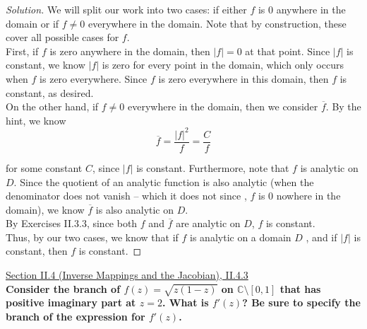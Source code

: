 \documentclass[11pt]{article}
\newcommand{\C}{\mathbb{C}}
\newenvironment{solution}
  {\renewcommand\qedsymbol{$\blacksquare$}\begin{proof}[Solution]}
  {\end{proof}}
\theoremstyle{definition}
\begin{document}
\begin{solution}
We will split our work into two cases: if either $f$ is $0$ anywhere in the domain or if $f \neq 0$ everywhere in the domain. Note that by construction, these cover all possible cases for $f$.\\

First, if $f$ is zero anywhere in the domain, 
then $|f| = 0$ at that point. Since $|f|$ is constant, we know $|f|$ is zero for every point in the domain, which only occurs when $f$ is zero everywhere. Since $f$ is zero everywhere in this domain, then $f$ is constant, as desired. \\

On the other hand, if $f \neq 0$ everywhere in the domain, then we consider $\overline{f}$. By the hint, we know 
\[ \overline{f} = \frac{|f|^2}{f} = \frac{C}{f} \]

for some constant $C$, since $|f|$ is constant. Furthermore, note that $f$ is analytic on $D$. 
Since the quotient of an analytic function is also analytic (when the denominator does not vanish -- which it does not since , $f$ is $0$ nowhere in the domain), we know $\overline{f}$ is also analytic on $D$. \\

By Exercises II.3.3, since both $f$ and $\overline{f}$ are analytic on $D$, $f$ is constant. \\

Thus, by our two cases, we know that if $f$ is analytic on a domain $D$ , and if $|f|$ is constant, then $f$ is constant. \end{solution}

\newpage

\underline{Section II.4 (Inverse Mappings and the Jacobian), II.4.3} \\

\textbf{Consider the branch of $f(z) = \sqrt{z(1-z)}$ on $\C \setminus [0, 1]$ that has positive imaginary part at $z=2$. 
What is $f'(z)$? Be sure to specify the branch of the expression for $f'(z)$.} \\
\end{document}
